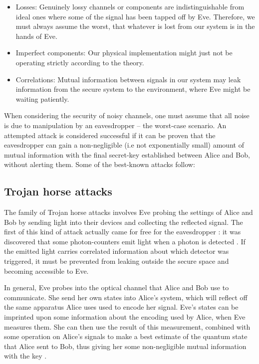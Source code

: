\begin{itemize}
	\item Losses: Genuinely lossy channels or components are indistinguishable from ideal ones where some of the signal has been tapped off by Eve. Therefore, we must always assume the worst, that whatever is lost from our system is in the hands of Eve.
	\item Imperfect components: Our physical implementation might just not be operating strictly according to the theory.
	\item Correlations: Mutual information between signals in our system may leak information from the secure system to the environment, where Eve might be waiting patiently.
\end{itemize}

When considering the security of noisy channels, one must assume that all noise is due to manipulation by an eavesdropper -- the worst-case scenario. An attempted attack is considered successful if it can be proven that the eavesdropper can gain a non-negligible (i.e not exponentially small) amount of mutual information with the final secret-key established between Alice and Bob, without alerting them. Some of the best-known attacks follow:

\subsection{Trojan horse attacks}

The family of Trojan horse attacks involves Eve probing the settings of Alice and Bob by sending light into their devices and collecting the reflected signal. The first of this kind of attack actually came for free for the eavesdropper \cite{bib:RevModPhys.81.1301}: it was discovered that some photon-counters emit light when a photon is detected \cite{bib:kurtsiefer2001breakdown}. If the emitted light carries correlated information about which detector was triggered, it must be prevented from leaking outside the secure space and becoming accessible to Eve.

In general, Eve probes into the optical channel that Alice and Bob use to communicate. She send her own states into Alice's system, which will reflect off the same apparatus Alice uses used to encode her signal. Eve's states can be imprinted upon some information about the encoding used by Alice, when Eve measures them. She can then use the result of this measurement, combined with some operation on Alice's signals to make a best estimate of the quantum state that Alice sent to Bob, thus giving her some non-negligible mutual information with the key \cite{bib:PhysRevA.97.042335}.


